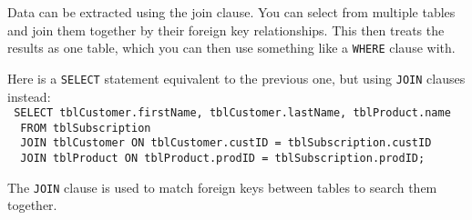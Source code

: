 \documentclass[../main.tex]{subfile}
\begin{document}

Data can be extracted using the join clause. You can select from multiple tables and join them together by their foreign key relationships. This then treats the results as one table, which you can then use something like a \texttt{WHERE} clause with.

Here is a \texttt{SELECT} statement equivalent to the previous one, but using \texttt{JOIN} clauses instead:\\
\texttt{
SELECT tblCustomer.firstName, tblCustomer.lastName, tblProduct.name\\
  FROM tblSubscription\\
  JOIN tblCustomer ON tblCustomer.custID = tblSubscription.custID\\
  JOIN tblProduct ON tblProduct.prodID = tblSubscription.prodID;
}

The \texttt{JOIN} clause is used to match foreign keys between tables to search them together.
\end{document}

